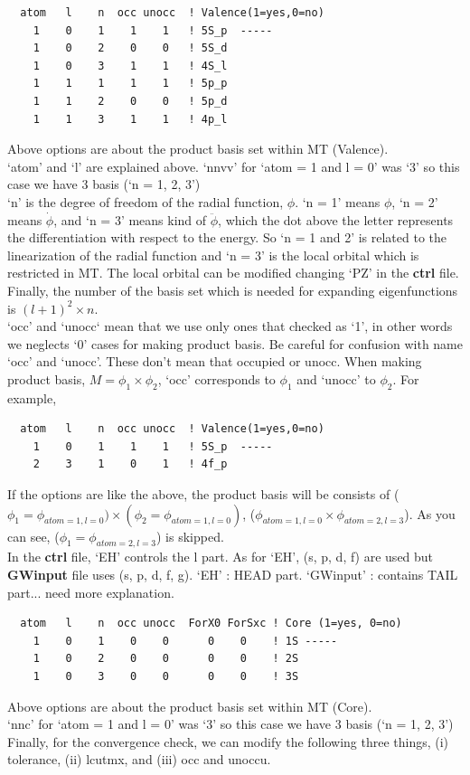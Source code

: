 {\begin{enumerate}
\begin{verbatim}
  atom   l    n  occ unocc  ! Valence(1=yes,0=no)
    1    0    1    1    1   ! 5S_p  -----
    1    0    2    0    0   ! 5S_d
    1    0    3    1    1   ! 4S_l
    1    1    1    1    1   ! 5p_p
    1    1    2    0    0   ! 5p_d
    1    1    3    1    1   ! 4p_l
\end{verbatim}
Above options are about the product basis set within MT (Valence).\\
`atom' and `l' are explained above. `nnvv' for `atom = 1 and l = 0' was `3' so this case we have 3 basis (`n = 1, 2, 3')\\
`n' is the degree of freedom of the radial function, $\phi$. `n = 1'
      means $\phi$, `n = 2' means $\dot\phi$, and `n = 3' means kind of
      $\ddot\phi$, which the dot above the letter represents the
      differentiation with respect to the energy. So `n = 1 and 2' is
      related to the linearization of the radial function and `n = 3' is
      the local orbital which is restricted in MT. The local orbital can
      be modified changing `PZ' in the {\bf ctrl} file. Finally, the
      number of the basis set which is needed for expanding eigenfunctions is $(l+1)^2 \times n$.\\
`occ' and `unocc` mean that we use only ones that checked as `1', in other words we neglects `0' cases for making product basis. Be careful for confusion with name `occ' and `unocc'. These don't mean that occupied or unocc. When making product basis, $M = \phi_1 \times \phi_2$, `occ' corresponds to $\phi_1$ and `unocc' to $\phi_2$. For example, 
\begin{verbatim}
  atom   l    n  occ unocc  ! Valence(1=yes,0=no)
    1    0    1    1    1   ! 5S_p  -----
    2    3    1    0    1   ! 4f_p
\end{verbatim}
If the options are like the above, the product basis will be consists of ($\phi_1 = \phi_{atom=1,l=0}) \times (\phi_2 = \phi_{atom=1,l=0})$, ($\phi_{atom=1,l=0} \times \phi_{atom=2,l=3}$). As you can see, ($\phi_1 = \phi_{atom=2,l=3}$) is skipped.\\
In the {\bf ctrl} file, `EH' controls the l part. As for `EH', (s, p, d, f) are used but {\bf GWinput} file uses (s, p, d, f, g). `EH' : HEAD part. `GWinput' : contains TAIL part... need more explanation.

\begin{verbatim}
  atom   l    n  occ unocc  ForX0 ForSxc ! Core (1=yes, 0=no)
    1    0    1    0    0      0    0    ! 1S -----
    1    0    2    0    0      0    0    ! 2S
    1    0    3    0    0      0    0    ! 3S
\end{verbatim}
Above options are about the product basis set within MT (Core).\\
`nnc' for `atom = 1 and l = 0' was `3' so this case we have 3 basis (`n = 1, 2, 3')\\
Finally, for the convergence check, we can modify the following three things, (i) tolerance, (ii) lcutmx, and (iii) occ and unoccu.



\end{enumerate}}
